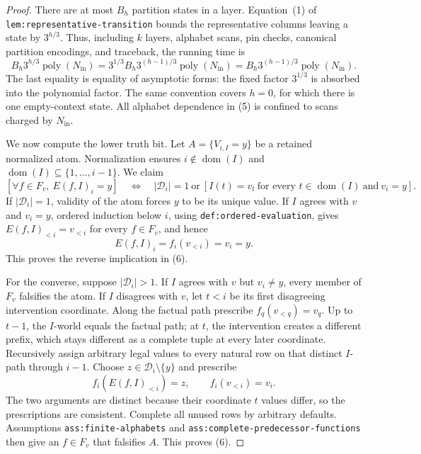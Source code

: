 \documentclass{article}
\begin{document}
\begin{proof}
There are at most \(B_h\) partition states in a layer.  Equation~(1) of \texttt{lem:representative-transition} bounds the representative columns leaving a state by \(3^{h/3}\).  Thus, including \(k\) layers, alphabet scans, pin checks, canonical partition encodings, and traceback, the running time is
\[
 B_h3^{h/3}\operatorname{poly}(N_{\mathrm{in}})
 =3^{1/3}B_h3^{(h-1)/3}\operatorname{poly}(N_{\mathrm{in}})
 =B_h3^{(h-1)/3}\operatorname{poly}(N_{\mathrm{in}}).
\tag{5}
\]
The last equality is equality of asymptotic forms: the fixed factor \(3^{1/3}\) is absorbed into the polynomial factor.  The same convention covers \(h=0\), for which there is one empty-context state.  All alphabet dependence in (5) is confined to scans charged by \(N_{\mathrm{in}}\).

We now compute the lower truth bit.  Let \(A=\{V_{i,I}=y\}\) be a retained normalized atom.  Normalization ensures \(i\notin\operatorname{dom}(I)\) and \(\operatorname{dom}(I)\subseteq\{1,\ldots,i-1\}\).  We claim
\[
 \left[\forall f\in F_v,\ E(f,I)_i=y\right]
 \quad\Longleftrightarrow\quad
 |\mathcal D_i|=1
 \ \text{or}\ 
 \left[I(t)=v_t\ \text{for every }t\in\operatorname{dom}(I)\ \text{and}\ v_i=y\right].
\tag{6}
\]
If \(|\mathcal D_i|=1\), validity of the atom forces \(y\) to be its unique value.  If \(I\) agrees with \(v\) and \(v_i=y\), ordered induction below \(i\), using \texttt{def:ordered-evaluation}, gives \(E(f,I)_{<i}=v_{<i}\) for every \(f\in F_v\), and hence
\[
 E(f,I)_i=f_i(v_{<i})=v_i=y.
\]
This proves the reverse implication in (6).

For the converse, suppose \(|\mathcal D_i|>1\).  If \(I\) agrees with \(v\) but \(v_i\neq y\), every member of \(F_v\) falsifies the atom.  If \(I\) disagrees with \(v\), let \(t<i\) be its first disagreeing intervention coordinate.  Along the factual path prescribe \(f_q(v_{<q})=v_q\).  Up to \(t-1\), the \(I\)-world equals the factual path; at \(t\), the intervention creates a different prefix, which stays different as a complete tuple at every later coordinate.  Recursively assign arbitrary legal values to every natural row on that distinct \(I\)-path through \(i-1\).  Choose \(z\in\mathcal D_i\setminus\{y\}\) and prescribe
\[
 f_i(E(f,I)_{<i})=z,
 \qquad f_i(v_{<i})=v_i.
\]
The two arguments are distinct because their coordinate \(t\) values differ, so the prescriptions are consistent.  Complete all unused rows by arbitrary defaults.  Assumptions \texttt{ass:finite-alphabets} and \texttt{ass:complete-predecessor-functions} then give an \(f\in F_v\) that falsifies \(A\).  This proves (6).


\end{proof}
\end{document}
